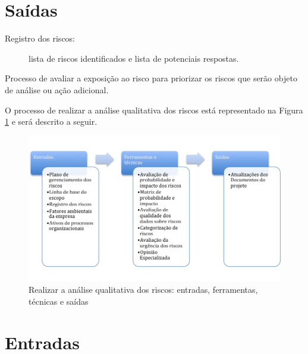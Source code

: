 \section{Saídas}

\begin{description}
	
	\item[Registro dos riscos:] lista de riscos identificados e lista de potenciais respostas.
	
\end{description}


Processo de avaliar a exposição ao risco para priorizar os riscos que serão objeto de análise ou ação adicional.

O processo de realizar a análise qualitativa dos riscos está representado na Figura \ref{fig:riscos:analise:qual:efts} e será descrito a seguir.

\begin{figure}[!h]
	\centering
	\includegraphics[scale=0.5]{Figuras/riscos_efts_analise_qual.png}
	\caption{Realizar a análise qualitativa dos riscos: entradas, ferramentas, técnicas e saídas}
	\label{fig:riscos:analise:qual:efts}
\end{figure}

\section{Entradas}

